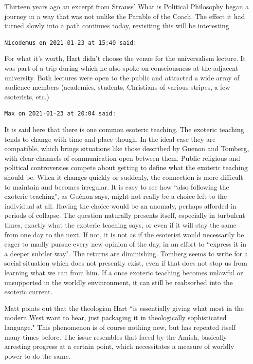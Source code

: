 \begin{footnotesize}
\begin{sffamily}
Thirteen years ago an excerpt from Strauss' What is Political Philosophy began a journey in a way that was not unlike the Parable of the Coach. The effect it had turned slowly into a path continues today, revisiting this will be interesting.


\hfill

\texttt{Nicodemus on 2021-01-23 at 15:40 said: }

For what it's worth, Hart didn't choose the venue for the universalism lecture. It was part of a trip during which he also spoke on consciousness at the adjacent university. Both lectures were open to the public and attracted a wide array of audience members (academics, students, Christians of various stripes, a few esoterists, etc.)


\hfill

\texttt{Max on 2021-01-23 at 20:04 said: }

It is said here that there is one common esoteric teaching. The exoteric teaching tends to change with time and place though. In the ideal case they are compatible, which brings situations like those described by Guenon and Tomberg, with clear channels of communication open between them. Public religious and political controversies compete about getting to define what the exoteric teaching should be. When it changes quickly or suddenly, the connection is more difficult to maintain and becomes irregular. It is easy to see how ``also following the exoteric teaching", as Guénon says, might not really be a choice left to the individual at all. Having the choice would be an anomaly, perhaps afforded in periods of collapse. The question naturally presents itself, especially in turbulent times, exactly what the exoteric teaching says, or even if it will stay the same from one day to the next. If not, it is not as if the esoterist would necessarily be eager to madly pursue every new opinion of the day, in an effort to ``express it in a deeper subtler way". The returns are diminishing. Tomberg seems to write for a social situation which does not presently exist, even if that does not stop us from learning what we can from him. If a once exoteric teaching becomes unlawful or unsupported in the worldly envinronment, it can still be reabsorbed into the esoteric current.

Matt points out that the theologian Hart ``is essentially giving what most in the modern West want to hear, just packaging it in theologically sophisticated language." This phenomenon is of course nothing new, but has repeated itself many times before. The issue resembles that faced by the Amish, basically arresting progress at a certain point, which necessitates a measure of worldly power to do the same.


\end{sffamily}\end{footnotesize}
